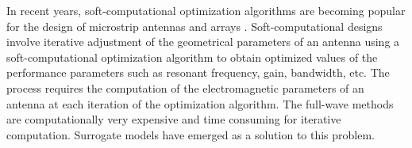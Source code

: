%
%
In recent years, soft-computational optimization algorithms are becoming popular for the design of microstrip antennas and arrays \cite{UwbPmaGaFdtd, cadNASA, compCAD4Arry, antSurrD01, surrMTM01, antSurrConstMO}. Soft-computational designs involve iterative adjustment of the geometrical parameters of an antenna using a soft-computational optimization algorithm to obtain optimized values of the performance parameters such as resonant frequency, gain, bandwidth, etc. The process requires the computation of the electromagnetic parameters of an antenna at each iteration of the optimization algorithm. The full-wave methods are computationally very expensive and time consuming for iterative computation. Surrogate models have emerged as a solution to this problem.


